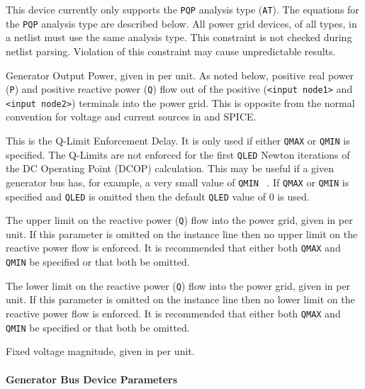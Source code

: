 \begin{Device}
\begin{Parameters}
This device currently only supports the \texttt{PQP} analysis type (\texttt{AT}). 
The equations for the  \texttt{PQP} analysis type are described below.  All power grid
devices, of all types, in a \Xyce{} netlist must use the same analysis type.  This 
constraint is not checked during netlist parsing.  Violation of this constraint may 
cause unpredictable results.

Generator Output Power, given in per unit.  As noted below, positive real power
(\texttt{P}) and positive reactive power (\texttt{Q}) flow out of the positive 
(\texttt{<input node1>} and \texttt{<input node2>}) terminals into the power grid.
This is opposite from the normal convention for voltage and current sources
in \Xyce{} and SPICE. 

This is the Q-Limit Enforcement Delay.  It is only used if either \texttt{QMAX} or
\texttt{QMIN} is specified.  The Q-Limits are not enforced for the first \texttt{QLED}
Newton iterations of the DC Operating Point (DCOP) calculation.  This may be useful if
a given generator bus has, for example, a very small value of \texttt{QMIN} ~\cite{Milano}.
If \texttt{QMAX} or \texttt{QMIN} is specified and \texttt{QLED} is omitted then the default
\texttt{QLED} value of 0 is used.

The upper limit on the reactive power (\texttt{Q}) flow into the power grid, given in per unit.
If this parameter is omitted on the instance line then no upper limit on the reactive power flow
is enforced.  It is recommended that either both \texttt{QMAX} and \texttt{QMIN} be
specified or that both be omitted.

The lower limit on the reactive power (\texttt{Q}) flow into the power grid, given in per unit. 
If this parameter is omitted on the instance line then no lower limit on the reactive power flow
is enforced.  It is recommended that either both \texttt{QMAX} and \texttt{QMIN} be
specified or that both be omitted. 

Fixed voltage magnitude, given in per unit.

\end{Parameters}
\end{Device}

\paragraph{Generator Bus Device Parameters}



